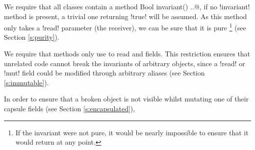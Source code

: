We require that all classes contain a \Q@read method Bool invariant() {..}@, if no \Q!invariant! method is present, a trivial one returning \Q!true! will be assumed. As this method only takes a \Q!read! parameter (the receiver), we can be sure that it is pure \footnote{If the invariant were not pure, it would be nearly impossible to ensure that it would return \Q@true@ at any point.} (see Section \ref{s:purity}).

We require that \Q@invariant@ methods only use \Q@this@ to read \Q@imm@ and \Q@capsule@ fields. This restriction ensures that unrelated code cannot break the invariants of arbitrary objects, since a \Q!read! or \Q!mut! field could be modified through arbitrary aliases (see Section \ref{s:immutable}). 

In order to ensure that a broken object is not visible whilst mutating one of their capsule fields (see Section \ref{s:encapsulated}), 

